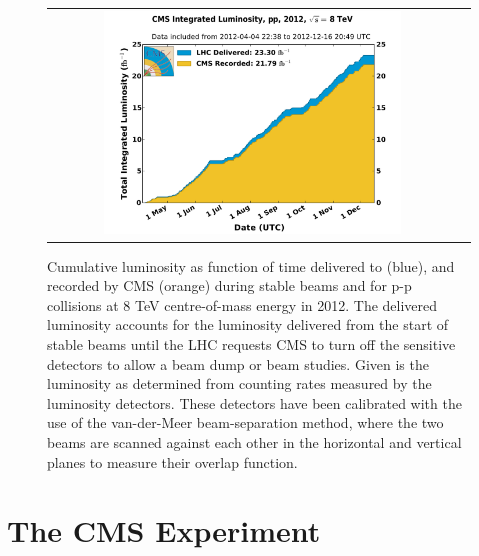 \begin{figure}[tbh!]
	\centering
	\begin{tabular}{cc}
		\includegraphics[width=0.75\textwidth]{detector/pics/int_lumi_per_day_cumulative_pp_2012.pdf}
	\end{tabular}
	\caption{Cumulative luminosity as function of time delivered to (blue), and recorded by CMS (orange) during stable beams and for p-p collisions at 8 TeV centre-of-mass energy in 2012. The delivered luminosity accounts for the luminosity delivered from the start of stable beams until the LHC requests CMS to turn off the sensitive detectors to allow a beam dump or beam studies. Given is the luminosity as determined from counting rates measured by the luminosity detectors. These detectors have been calibrated with the use of the van-der-Meer beam-separation method, where the two beams are scanned against each other in the horizontal and vertical planes to measure their overlap function.}
	\label{fig:lumi_2012}
\end{figure}

\clearpage

\section{The CMS Experiment}

